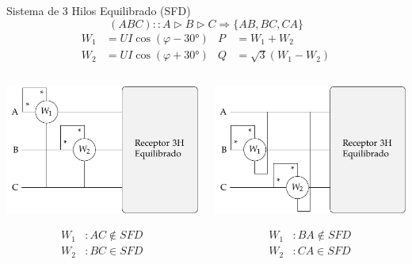 \documentclass[aspectratio=169, usenames,svgnames,dvipsnames]{beamer}
\begin{document}
\begin{frame}[label={sec:org3bd21b7},plain]{Sistema de 3 Hilos Equilibrado (SFD)}
\[
  \boxed{(ABC) :: A \triangleright B \triangleright C \Longrightarrow \{AB, BC, CA\}}
\]
\begin{align*}
  W_1 &= UI\cos(\varphi - \ang{30}) & P &= W_1 + W_2\\
  W_2 &= UI\cos(\varphi + \ang{30}) & Q &= \sqrt{3}(W_1 - W_2)
\end{align*}
\begin{columns}
\begin{column}{0.33\columnwidth}
\begin{center}
\includegraphics[width=.9\linewidth]{../figs/Potencia3H_Equilibrado_AB.pdf}
\end{center}
\begin{align*}
  W_1&: AC \notin SFD\\
  W_2&: BC \in SFD\\
\end{align*}
\end{column}
\begin{column}{0.33\columnwidth}
\begin{center}
\includegraphics[width=.9\linewidth]{../figs/Potencia3H_Equilibrado_BC.pdf}
\end{center}
\begin{align*}
  W_1&: BA \notin SFD\\
  W_2&: CA \in SFD\\
\end{align*}
\end{column}


\end{columns}
\end{frame}
\end{document}
